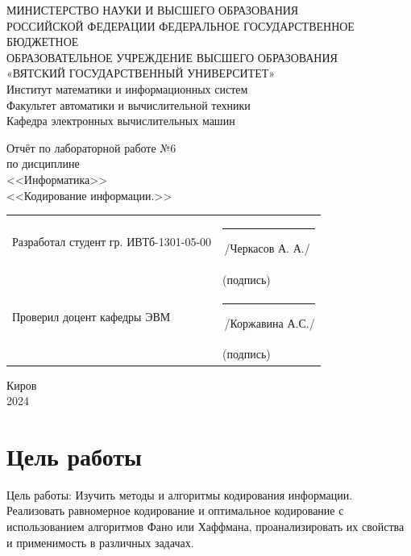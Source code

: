 \documentclass[oneside,a4paper,14pt]{extarticle}
\begin{document}
\newpage
\thispagestyle{empty}
\begin{center}
	МИНИСТЕРСТВО НАУКИ И ВЫСШЕГО ОБРАЗОВАНИЯ\\
	РОССИЙСКОЙ ФЕДЕРАЦИИ
	ФЕДЕРАЛЬНОЕ ГОСУДАРСТВЕННОЕ БЮДЖЕТНОЕ\\
	ОБРАЗОВАТЕЛЬНОЕ
	УЧРЕЖДЕНИЕ ВЫСШЕГО ОБРАЗОВАНИЯ\\
	«ВЯТСКИЙ ГОСУДАРСТВЕННЫЙ УНИВЕРСИТЕТ»\\
	Институт математики и информационных систем\\
	Факультет автоматики и вычислительной техники\\
	Кафедра электронных вычислительных машин
\end{center}
\vspace{20mm}

\begin{center}
	Отчёт по лабораторной работе №6\\
	по дисциплине\\
	<<Информатика>>\\
	<<Кодирование информации.>>\\
\end{center}
\vspace{40mm}
\noindent
\begin{tabular}{ll}
	Разработал студент гр. ИВТб-1301-05-00 & \rule[-1mm]{30mm}{0.10mm}\,/Черкасов А. А./ \\
	                                       & \hspace{8mm}\footnotesize(подпись)          \\

	Проверил доцент кафедры ЭВМ            & \rule[-1mm]{30mm}{0.10mm}\,/Коржавина А.С./ \\
	                                       & \hspace{8mm}\footnotesize(подпись)          \\
\end{tabular}

\vfill
\begin{center}
	Киров\\
	2024
\end{center}

\newpage\thispagestyle{plain}
\section*{Цель работы}
Цель работы: Изучить методы и алгоритмы кодирования информации. Реализовать
равномерное кодирование и оптимальное кодирование с использованием алгоритмов
Фано или Хаффмана, проанализировать их свойства и применимость в различных
задачах.
\end{document}
